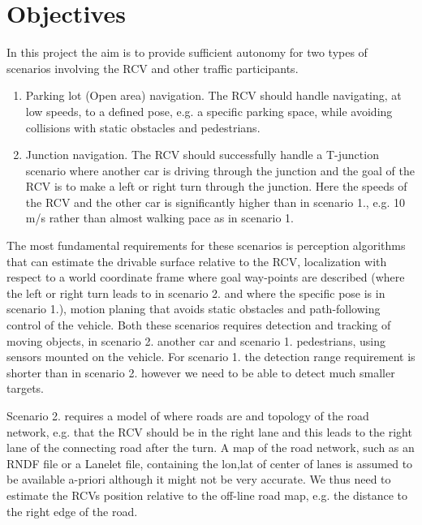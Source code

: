 \documentclass[11pt,a4paper]{article}
\begin{document}
\section{Objectives}

In this project the aim is to provide sufficient autonomy for two
types of scenarios involving the RCV and other traffic participants.


\begin{enumerate}
\item  Parking lot (Open area) navigation. The RCV should handle navigating,
at low speeds, to a defined pose, e.g. a specific parking space, while
avoiding collisions with static obstacles and pedestrians. 


\item  Junction navigation. The RCV should successfully handle a T-junction
scenario where another car is driving through the junction and the
goal of the RCV is to make a left or right turn through the
junction. Here the speeds of the RCV and the other car is
significantly higher than in scenario 1., e.g. 10 m/s rather than
almost walking pace as in scenario 1.



\end{enumerate}

The most fundamental requirements for these scenarios is perception
algorithms that can estimate the drivable surface relative to the RCV,
localization with respect to a world coordinate frame where goal
way-points are described (where the left or right turn leads to in
scenario 2. and where the specific pose is in scenario 1.), motion
planing that avoids static obstacles and path-following control of the
vehicle. Both these scenarios requires detection and tracking of moving
objects, in scenario 2. another car and scenario 1. pedestrians, using
sensors mounted on the vehicle. For scenario 1. the detection range
requirement is shorter than in scenario 2.  however we need to be able
to detect much smaller targets.

Scenario 2. requires a model of where roads are and topology of the
road network, e.g. that the RCV should be in the right lane and this
leads to the right lane of the connecting road after the turn. A map
of the road network, such as an RNDF file or a Lanelet file, containing
the lon,lat of center of lanes is assumed to be available a-priori
although it might not be very accurate. We thus need to estimate the
RCVs position relative to the off-line road map, e.g. the distance to
the right edge of the road.
\end{document}
